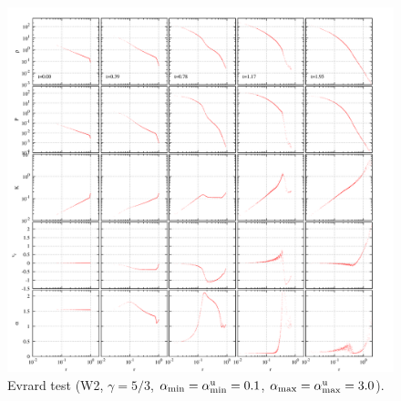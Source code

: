 \documentclass[fleqn,dvipdfmx]{article}
\begin{document}
\begin{figure}
  \begin{center}
    \includegraphics[width=14cm,bb=0 0 2120 2000]{fig/evrard/draw.png}
  \end{center}
  \caption{Evrard test (W2, $\gamma=5/3$, $\alpha_{\rm
      min}=\alpha^{\rm u}_{\rm min}=0.1$, $\alpha_{\rm
      max}=\alpha^{\rm u}_{\rm max}=3.0$).}
\end{figure}
\end{document}
